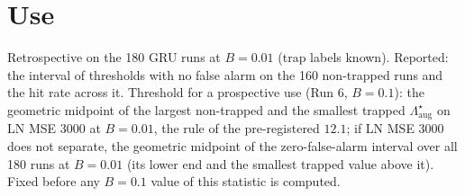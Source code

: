 \documentclass[11pt]{article}
\begin{document}
\section*{Use}
Retrospective on the 180 GRU runs at $B=0.01$ (trap labels known). Reported: the interval of thresholds with no false alarm on
the 160 non-trapped runs and the hit rate across it. Threshold for a prospective use (Run 6, $B=0.1$): the geometric midpoint
of the largest non-trapped and the smallest trapped $\Lambda^\star_{\mathrm{aug}}$ on LN MSE 3000 at $B=0.01$, the rule of the
pre-registered $12.1$; if LN MSE 3000 does not separate, the geometric midpoint of the zero-false-alarm interval over all 180
runs at $B=0.01$ (its lower end and the smallest trapped value above it). Fixed before any $B=0.1$ value of this statistic is
computed.
\end{document}
